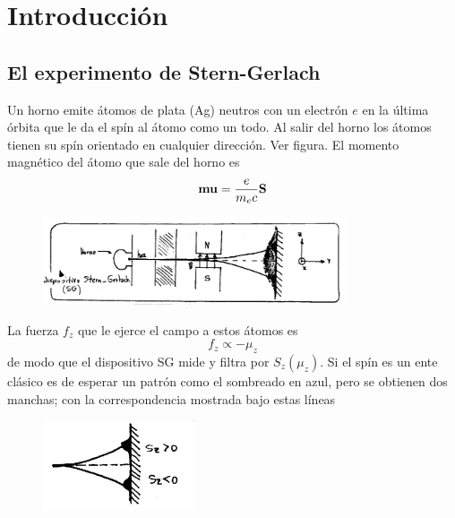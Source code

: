\documentclass[10pt,oneside]{CBFT_book}
\begin{document}
\chapter{Introducción}


\section{El experimento de Stern-Gerlach}

Un horno emite átomos de plata (Ag) neutros con un electrón $e$ en la última órbita que le da el spín
al átomo como un todo. Al salir del horno los átomos tienen su spín orientado en cualquier dirección.
Ver figura.
El momento magnético del átomo que sale del horno es 
\[
	\vb{mu} = \frac{e}{m_e c} \vb{S}
\]

\begin{figure}[htb]
	\begin{center}
	\includegraphics[width=0.8\textwidth]{images/teo2_1.pdf}	 
	\end{center}
	\caption{}
\end{figure} 

La fuerza $f_z$ que le ejerce el campo  a estos átomos es 
\[
	f_z \propto - \mu_z
\]
de modo que el dispositivo SG mide y filtra por $S_z(\mu_z)$. Si el spín es un ente clásico
es de esperar un patrón como el sombreado en azul, pero se obtienen dos manchas; con la
correspondencia mostrada bajo estas líneas
\begin{figure}[htb]
	\begin{center}
	\includegraphics[width=0.4\textwidth]{images/teo2_2.pdf}	 
	\end{center}
	\caption{}
\end{figure} 
\end{document}
